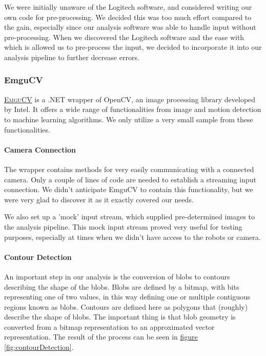 \documentclass[10pt, abstracton, twocolumn]{scrartcl}
\newcommand{\fref}[1]{\hyperref[#1]{figure \vref{#1}}}
\newcommand{\link}[2]{\textsc{\href{#1}{#2}}}
\begin{document}
We were initially unaware of the Logitech software, and considered writing our own code for pre-processing. We decided this was too much effort compared to the gain, especially since our analysis software was able to handle input without pre-processing. When we discovered the Logitech software and the ease with which is allowed us to pre-process the input, we decided to incorporate it into our analysis pipeline to further decrease errors.

\subsubsection{EmguCV}
\link{http://www.emgu.com/wiki/index.php/Main_Page}{EmguCV} is a .NET wrapper of OpenCV, an image processing library developed by Intel. It offers a wide range of functionalities from image and motion detection to machine learning algorithms. We only utilize a very small sample from these functionalities.

\paragraph{Camera Connection}
The wrapper contains methods for very easily communicating with a connected camera. Only a couple of lines of code are needed to establish a streaming input connection. We didn't anticipate EmguCV to contain this functionality, but we were very glad to discover it as it exactly covered our needs.

We also set up a 'mock' input stream, which supplied pre-determined images to the analysis pipeline. This mock input stream proved very useful for testing purposes, especially at times when we didn't have access to the robots or camera.

\paragraph{Contour Detection}
An important step in our analysis is the conversion of blobs to contours describing the shape of the blobs. Blobs are defined by a bitmap, with bits representing one of two values, in this way defining one or multiple contiguous regions known as blobs. Contours are defined here as polygons that (roughly) describe the shape of blobs. The important thing is that blob geometry is converted from a bitmap representation to an approximated vector representation. The result of the process can be seen in \fref{fig:contourDetection}.
\end{document}

